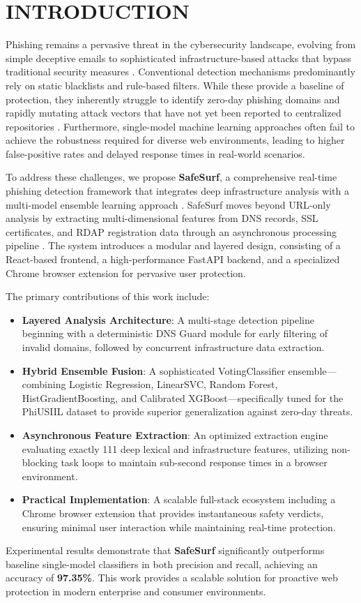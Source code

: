\section{INTRODUCTION}
\label{sec:intro}

Phishing remains a pervasive threat in the cybersecurity landscape, evolving from simple deceptive emails to sophisticated infrastructure-based attacks that bypass traditional security measures \cite{ref1}. Conventional detection mechanisms predominantly rely on static blacklists and rule-based filters. While these provide a baseline of protection, they inherently struggle to identify zero-day phishing domains and rapidly mutating attack vectors that have not yet been reported to centralized repositories \cite{ref11, ref13}. Furthermore, single-model machine learning approaches often fail to achieve the robustness required for diverse web environments, leading to higher false-positive rates and delayed response times in real-world scenarios.

To address these challenges, we propose \textbf{SafeSurf}, a comprehensive real-time phishing detection framework that integrates deep infrastructure analysis with a multi-model ensemble learning approach \cite{ref12}. SafeSurf moves beyond URL-only analysis by extracting multi-dimensional features from DNS records, SSL certificates, and RDAP registration data through an asynchronous processing pipeline \cite{ref6, ref7, ref8}. The system introduces a modular and layered design, consisting of a React-based frontend, a high-performance FastAPI backend, and a specialized Chrome browser extension for pervasive user protection. 

The primary contributions of this work include: 
\begin{itemize}
    \item \textbf{Layered Analysis Architecture}: A multi-stage detection pipeline beginning with a deterministic DNS Guard module for early filtering of invalid domains, followed by concurrent infrastructure data extraction.
    \item \textbf{Hybrid Ensemble Fusion}: A sophisticated VotingClassifier ensemble—combining Logistic Regression, LinearSVC, Random Forest, HistGradientBoosting, and Calibrated XGBoost—specifically tuned for the PhiUSIIL dataset \cite{ref10} to provide superior generalization against zero-day threats.
    \item \textbf{Asynchronous Feature Extraction}: An optimized extraction engine evaluating exactly 111 deep lexical and infrastructure features, utilizing non-blocking task loops to maintain sub-second response times in a browser environment.
    \item \textbf{Practical Implementation}: A scalable full-stack ecosystem including a Chrome browser extension that provides instantaneous safety verdicts, ensuring minimal user interaction while maintaining real-time protection.
\end{itemize}

Experimental results demonstrate that \textbf{SafeSurf} significantly outperforms baseline single-model classifiers in both precision and recall, achieving an accuracy of \textbf{97.35\%}. This work provides a scalable solution for proactive web protection in modern enterprise and consumer environments.
